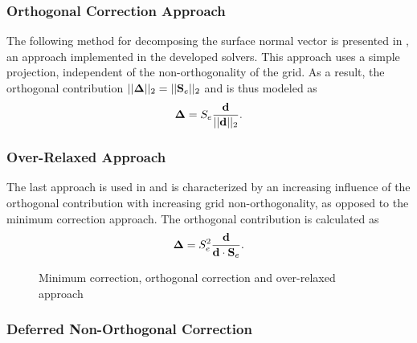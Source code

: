 \subsubsection{Orthogonal Correction Approach}
\label{seq:orthcorrapproach}

The following method for decomposing the surface normal vector is presented in \cite{ferziger02}, an approach implemented in the developed solvers. This approach uses a simple projection, independent of the non-orthogonality of the grid. As a result, the orthogonal contribution \(||\boldsymbol{\Delta}||_2 =  ||\mathbf{S}_e||_2\) and is thus modeled as 
\begin{displaymath}
  \boldsymbol{\Delta} =  S_e \frac{\mathbf{d}}{ ||\mathbf{d}||_2}.
\end{displaymath}

\subsubsection{Over-Relaxed Approach}

The last approach is used in \cite{jasak96,darwish09} and is characterized by an increasing influence of the orthogonal contribution with increasing grid non-orthogonality, as opposed to the minimum correction approach. The orthogonal contribution is calculated as
\begin{displaymath}
  \boldsymbol{\Delta} =  S_e^2 \frac{\mathbf{d}}{ \mathbf{d} \cdot \mathbf{S}_e }.
\end{displaymath} 

\begin{figure}[h]
\label{fig:nonorth}
\hfil
{}
\hfil
{}
\caption{Minimum correction, orthogonal correction and over-relaxed approach}
\end{figure}

\subsubsection{Deferred Non-Orthogonal Correction}

